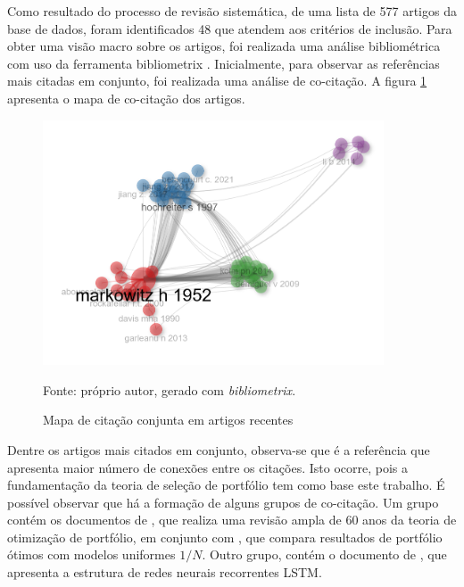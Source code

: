         \ipar Como resultado do processo de revisão sistemática, de uma lista de 577 artigos da base de dados, foram identificados 48 que atendem aos critérios de inclusão. Para obter uma visão macro sobre os artigos, foi realizada uma análise bibliométrica com uso da ferramenta bibliometrix \cite{aria2017bibliometrix}. Inicialmente, para observar as referências mais citadas em conjunto, foi realizada uma análise de co-citação. A figura \ref{fig:co_citacao} apresenta o mapa de co-citação dos artigos.

        \begin{figure}[H]
            \centering
            \caption{Mapa de citação conjunta em artigos recentes}
            \label{fig:co_citacao}
            \includegraphics[width=0.9\textwidth]{./imagens/cocitation_network.png}
            \par \footnotesize Fonte: próprio autor, gerado com \textit{bibliometrix}.
        \end{figure}

        \ipar Dentre os artigos mais citados em conjunto, observa-se que  é a referência que apresenta maior número de conexões entre os citações. Isto ocorre, pois a fundamentação da teoria de seleção de portfólio tem como base este trabalho. É possível observar que há a formação de alguns grupos de co-citação. Um grupo contém os documentos de , que realiza uma revisão ampla de 60 anos da teoria de otimização de portfólio, em conjunto com , que compara resultados de portfólio ótimos com modelos uniformes $1/N$. Outro grupo, contém o documento de , que apresenta a estrutura de redes neurais recorrentes \acrshort{LSTM}.
        
